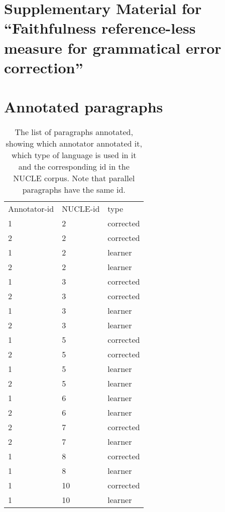 \documentclass[a4paper, 11pt]{article}
\begin{document}
\appendix

\title{}

\onecolumn
\section*{\centering\Large Supplementary Material for ``Faithfulness reference-less measure for grammatical error correction''}
\section{Annotated paragraphs}
	\begin{table}[hb]
		\centering
		\begin{tabular}{lll}
			Annotator-id & NUCLE-id & type      \\
			1         & 2  & corrected \\
			2         & 2  & corrected \\
			1         & 2  & learner   \\
			2         & 2  & learner   \\
			1         & 3  & corrected \\
			2         & 3  & corrected \\
			1         & 3  & learner   \\
			2         & 3  & learner   \\
			1         & 5  & corrected \\
			2         & 5  & corrected \\
			1         & 5  & learner   \\
			2         & 5  & learner   \\
			1         & 6  & learner   \\
			2         & 6  & learner   \\
			2         & 7  & corrected \\
			2         & 7  & learner   \\
			1         & 8  & corrected \\
			1         & 8  & learner   \\
			1         & 10 & corrected \\
			1         & 10 & learner  
		\end{tabular}
		\caption{The list of paragraphs annotated, showing which annotator annotated it, which type of language is used in it and the corresponding id in the NUCLE corpus. Note that parallel paragraphs have the same id.\label{tab:annotated-paragraphs}}
	\end{table}
\FloatBarrier



\end{document}
